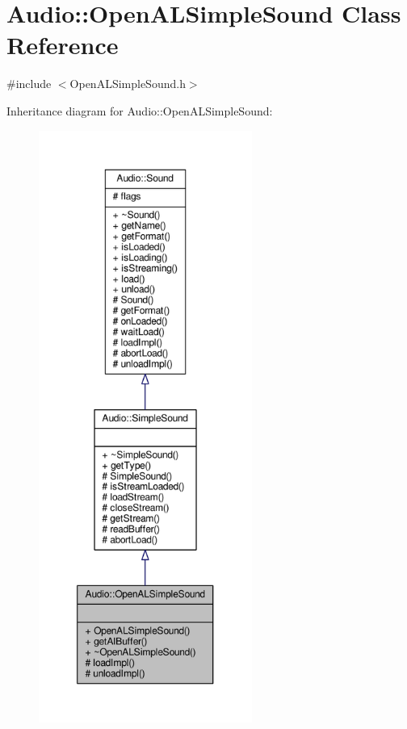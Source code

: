 \hypertarget{classAudio_1_1OpenALSimpleSound}{}\section{Audio\+:\+:Open\+A\+L\+Simple\+Sound Class Reference}
\label{classAudio_1_1OpenALSimpleSound}


{\ttfamily \#include $<$Open\+A\+L\+Simple\+Sound.\+h$>$}



Inheritance diagram for Audio\+:\+:Open\+A\+L\+Simple\+Sound\+:
\nopagebreak
\begin{figure}[H]
\begin{center}
\leavevmode
\includegraphics[height=550pt]{da/dd7/classAudio_1_1OpenALSimpleSound__inherit__graph}
\end{center}
\end{figure}


